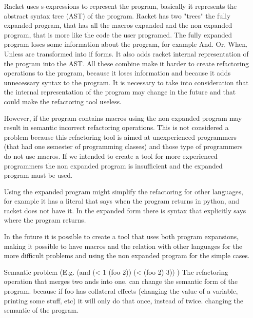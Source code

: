Racket uses s-expressions to represent the program, basically it represents the
abstract syntax tree (AST) of the program.
Racket has two "trees" the fully expanded program, that has all the macros
expanded and the non expanded program, that is more like the code the user programed.
The fully expanded program loses some information about the program, for example
And. Or, When, Unless are transformed into if forms.
It also adds racket internal representation of the program into the AST.
All these combine make it harder to create refactoring operations to the program,
because it loses information and because it adds unnecessary syntax to the program.
It is necessary to take into consideration that the internal representation of
the program may change in the future and that could make the refactoring tool
useless.


However, if the program contains macros using the non expanded program may
result in semantic incorrect refactoring operations. This is not considered a
problem because this refactoring tool is aimed at unexperienced programmers (that
had one semester of programming classes) and those type of programmers do not use
macros. If we intended to create a tool for more experienced programmers the non
expanded program is insufficient and the expanded program must be used.


Using the expanded program might simplify the refactoring for other languages,
for example it has a literal that says when the program returns in python, and
racket does not have it. In the expanded form there is syntax that explicitly says
where the program returns.

In the future it is possible to create a tool that uses both program expansions,
making it possible to have macros and the relation with other languages for the
more difficult problems and using the non expanded program for the simple cases.

Semantic problem (E.g. (and (< 1 (foo 2)) (< (foo 2) 3)) )
The refactoring operation that merges two ands into one, can change the semantic
form of the program. because if foo has collateral effects (changing the value of
a variable, printing some stuff, etc) it will only do that once, instead of twice.
changing the semantic of the program.

